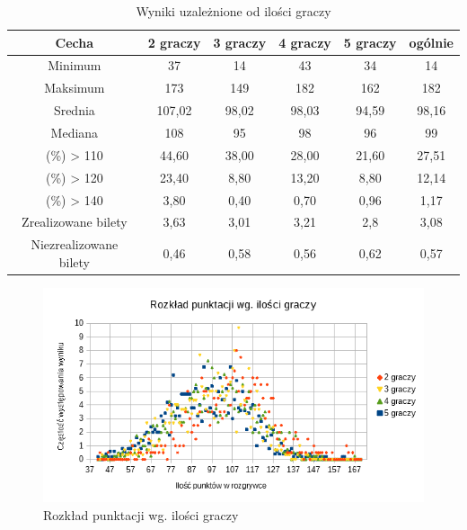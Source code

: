 \documentclass[12pt, oneside]{report}
\begin{document}
\begin{table}[h]
	\begin{center}
		\begin{tabular}{| c | c | c | c | c | c |} \hline
			Cecha & 2 graczy & 3 graczy & 4 graczy & 5 graczy & ogólnie \\ \hline
			Minimum & 37 & 14 & 43 & 34 & 14 \\ \hline
			Maksimum & 173 & 149 & 182 & 162 & 182 \\ \hline
			Srednia & 107,02 & 98,02 & 98,03 & 94,59 & 98,16 \\ \hline
			Mediana & 108 & 95 & 98 & 96 & 99 \\ \hline
			(\%) > 110 & 44,60 & 38,00 & 28,00 & 21,60 & 27,51 \\ \hline
			(\%) > 120 & 23,40 & 8,80 & 13,20 & 8,80 & 12,14 \\ \hline
			(\%) > 140 & 3,80 & 0,40 & 0,70 & 0,96 & 1,17 \\ \hline
			Zrealizowane bilety & 3,63 & 3,01 & 3,21 & 2,8 & 3,08 \\ \hline
			Niezrealizowane bilety & 0,46 & 0,58 & 0,56 & 0,62 & 0,57 \\ \hline
		\end{tabular}
		\caption{Wyniki uzależnione od ilości graczy}
		\label{table:algo_sizeresult}
	\end{center}
\end{table}

\begin{figure}
	\includegraphics{Wykrespunktow.png}
	\caption{Rozkład punktacji wg. ilości graczy}
	\label{figure:player_points_algo}
\end{figure}
\end{document}
